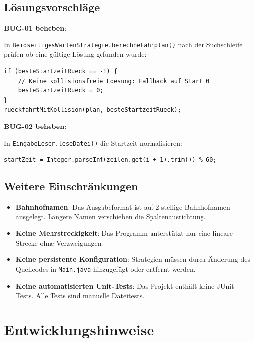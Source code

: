 \documentclass[12pt,a4paper]{article}
\begin{document}
\subsection{Lösungsvorschläge}

\textbf{BUG-01 beheben}:

In \texttt{BeidseitigesWartenStrategie.berechneFahrplan()} nach der Suchschleife prüfen ob eine gültige Lösung gefunden wurde:

\begin{lstlisting}[caption={Korrektur BUG-01}]
if (besteStartzeitRueck == -1) {
    // Keine kollisionsfreie Loesung: Fallback auf Start 0
    besteStartzeitRueck = 0;
}
rueckfahrtMitKollision(plan, besteStartzeitRueck);
\end{lstlisting}

\textbf{BUG-02 beheben}:

In \texttt{EingabeLeser.leseDatei()} die Startzeit normalisieren:

\begin{lstlisting}[caption={Korrektur BUG-02}]
startZeit = Integer.parseInt(zeilen.get(i + 1).trim()) % 60;
\end{lstlisting}

\subsection{Weitere Einschränkungen}

\begin{itemize}
    \item \textbf{Bahnhofnamen}: Das Ausgabeformat ist auf 2-stellige Bahnhofnamen ausgelegt. Längere Namen verschieben die Spaltenausrichtung.
    \item \textbf{Keine Mehrstreckigkeit}: Das Programm unterstützt nur eine lineare Strecke ohne Verzweigungen.
    \item \textbf{Keine persistente Konfiguration}: Strategien müssen durch Änderung des Quellcodes in \texttt{Main.java} hinzugefügt oder entfernt werden.
    \item \textbf{Keine automatisierten Unit-Tests}: Das Projekt enthält keine JUnit-Tests. Alle Tests sind manuelle Dateitests.
\end{itemize}

\section{Entwicklungshinweise}
\end{document}
